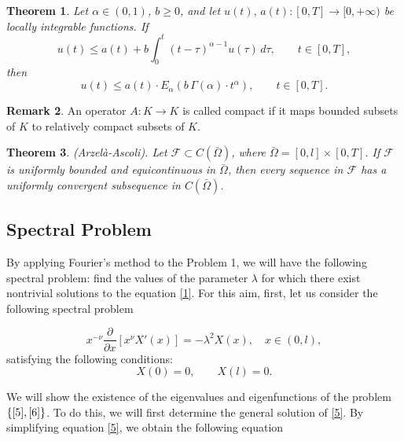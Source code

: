 \documentclass[reqno]{amsart}
\newtheorem{thm}{Theorem}[section]
\theoremstyle{definition}
\newtheorem{rem}[thm]{Remark}
\numberwithin{equation}{section}
\begin{document}
\begin{thm}\label{Gronwall}\cite{Ye2007} Let $\alpha\in(0,1)$, $b\geq 0$, and let 
$u(t),\,a(t):[0,T]\to[0,+\infty)$ be locally integrable functions. 
If
\begin{equation*}
    u(t)\leq a(t)+b\int_0^t(t-\tau)^{\alpha-1}u(\tau)\,d\tau,
    \qquad t\in[0,T],
\end{equation*}
then
\begin{equation*}
    u(t)\leq a(t)\cdot 
    E_{\alpha}\!\left(b\,\Gamma(\alpha)\cdot t^{\alpha}\right),
    \qquad t\in[0,T].
\end{equation*}
\end{thm}
\begin{rem}
 An operator $A: K \rightarrow K$ is called compact if it maps bounded subsets of $K$ to relatively compact subsets of $K$.
\end{rem} 
\begin{thm}\label{Ascoli}
 (Arzelà-Ascoli). Let $\mathcal{F} \subset C(\bar{\Omega})$, where $\bar{\Omega}=[0,l] \times[0, T]$. If $\mathcal{F}$ is uniformly bounded and equicontinuous in $\bar{\Omega}$, then every sequence in $\mathcal{F}$ has a uniformly convergent subsequence in $C(\bar{\Omega})$.
\end{thm}

\subsection{Spectral Problem}\label{sec5}

By applying Fourier's method to the Problem 1, we will have the following spectral problem: find the values of the parameter $\lambda$ for which there exist nontrivial solutions to the equation \eqref{1}.
For this aim, first, let  us consider the  following spectral problem 

\begin{equation}\label{5}
    x^{-\nu}\frac{\partial}{\partial x}\left[x^{\nu}X'(x)\right]=-\lambda^2 X(x),\quad x\in (0,l),
\end{equation}
satisfying the following conditions:
\begin{equation}\label{6}
X(0)=0, \qquad X(l)=0.
\end{equation}

We will show the existence of the eigenvalues and eigenfunctions of the problem $\left\{\eqref{5},\eqref{6}\right\}$. To do this,  we will first determine the general solution of \eqref{5}. By simplifying equation \eqref{5}, we obtain the following equation
\end{document}
